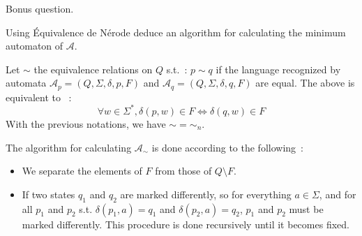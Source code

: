 \documentclass[a4paper,11pt]{exam}
\newcommand{\A}{\mathcal{A}}
\begin{document}
\begin{questions}
  \colorbox{gris}{
	\begin{minipage}[c]{15cm}
		Bonus question.
	\end{minipage}
}


 \question Using Équivalence de Nérode deduce an algorithm for calculating the minimum automaton of $\A $.

\begin{solution}
	Let $\sim$ the equivalence relations  on $Q$ s.t.~: $p \sim q$ if the language recognized by automata $\A_p = (Q,\Sigma,\delta,p,F)$
	and $\A_q = (Q,\Sigma,\delta,q,F)$ are equal.
	The above is equivalent to ~:
	\[
	\forall w \in \Sigma^*, \delta(p,w) \in F \iff \delta(q,w) \in F
	\]
	With the previous notations, we have $\sim = \sim_n$.
	
	The algorithm for calculating $\A_\sim$ is done according to the following~:
	\begin{itemize}
		\item We separate the elements of $F$ from those of $Q \setminus F$.
		\item If two states $q_1$ and $q_2$ are marked differently, so for everything $a \in \Sigma$, and for all $p_1$ and $p_2$ s.t. $\delta(p_1,a)=q_1$ and $\delta(p_2,a)=q_2$, $p_1$ and $p_2$ must be marked differently. This procedure is done recursively until it becomes fixed.
	\end{itemize}
\end{solution}



%
%
%
%
%
%
%
\end{questions}
\end{document}
